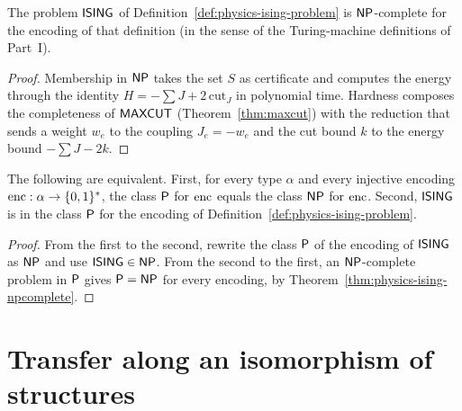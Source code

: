 \begin{theorem}
  \label{thm:physics-ising-npcomplete}
  \leanok
  The problem $\mathsf{ISING}$ of Definition~\ref{def:physics-ising-problem} is $\mathsf{NP}$-complete for the
  encoding of that definition (in the sense of the Turing-machine definitions of
  Part~I).
  \own{}
\end{theorem}

\begin{proof}
  \leanok
  Membership in $\mathsf{NP}$ takes the set $S$ as certificate and computes the energy through the
  identity $H = -\sum J + 2\,\mathrm{cut}_J$ in polynomial time. Hardness composes the
  completeness of $\mathsf{MAXCUT}$ (Theorem~\ref{thm:maxcut}) with the reduction that sends a weight $w_e$
  to the coupling $J_e = -w_e$ and the cut bound $k$ to the energy bound $-\sum J - 2k$.
\end{proof}

\begin{theorem}[$\cP = \cNP$ if and only if $\ISING \in \cP$]
  \label{thm:physics-p-np-ising}
  \leanok
  The following are equivalent. First, for every type $\alpha$ and every injective encoding
  $\mathrm{enc} : \alpha \to \{0,1\}^{*}$, the class $\mathsf{P}$ for $\mathrm{enc}$ equals the class $\mathsf{NP}$ for
  $\mathrm{enc}$. Second, $\mathsf{ISING}$ is in the class $\mathsf{P}$ for the encoding of
  Definition~\ref{def:physics-ising-problem}.
  \own{}
\end{theorem}

\begin{proof}
  \leanok
  From the first to the second, rewrite the class $\mathsf{P}$ of the encoding of $\mathsf{ISING}$ as $\mathsf{NP}$ and
  use $\mathsf{ISING} \in \mathsf{NP}$. From the second to the first, an $\mathsf{NP}$-complete problem in $\mathsf{P}$ gives
  $\cP = \cNP$ for every encoding, by Theorem~\ref{thm:physics-ising-npcomplete}.
\end{proof}

\section{Transfer along an isomorphism of structures}
\label{sec:physics-transfer}

